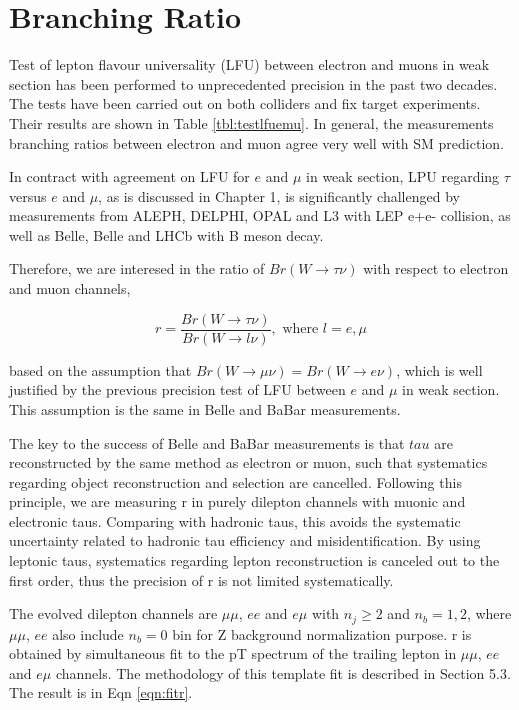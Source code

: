 

\section{Branching Ratio}

Test of lepton flavour universality (LFU) between electron and muons in 
weak section has been performed to unprecedented precision
in the past two decades. The tests have been carried out on both
colliders and fix target experiments. Their results are shown
in Table \ref{tbl:testlfuemu}. In general, the measurements
branching ratios between electron and muon agree very well with 
SM prediction.



In contract with agreement on LFU for $e$ and $\mu$ in weak section, LPU 
regarding $\tau$ versus $e$ and $\mu$, as is discussed in Chapter 1, 
is significantly challenged by 
measurements from ALEPH, DELPHI, OPAL and L3 with LEP e+e- collision, 
as well as Belle, Belle and LHCb with B meson decay.


Therefore, we are interesed in the ratio of $Br (W\to \tau \nu)$ with respect to electron
and muon channels,

\begin{equation}
    r = \frac{Br (W\to \tau \nu)}{Br (W\to l \nu)} , \text{ where } l=e,\mu
\end{equation}

based on the assumption that $Br (W\to \mu \nu) = Br( W\to e \nu )$, which
is well justified by the previous precision test of LFU between $e$ and $\mu$ in weak section.
This assumption is the same in Belle and BaBar measurements.

The key to the success of Belle and BaBar measurements is that $tau$ are reconstructed
by the same method as electron or muon, such that systematics regarding object
reconstruction and selection are cancelled.
Following this principle, we are measuring r in purely dilepton channels with muonic and electronic taus.
Comparing with hadronic taus, this avoids the systematic uncertainty related to hadronic tau efficiency
and misidentification.
By using leptonic taus, systematics regarding lepton reconstruction 
is canceled out to the first order, thus the precision of r is not limited systematically.

The evolved dilepton channels are $\mu\mu$, $ee$ and $e\mu$ with $n_j \geq 2$ and $n_b = 1,2$,
where $\mu\mu$, $ee$ also include $n_b = 0$ bin for Z background normalization purpose.
r is obtained by simultaneous fit to the pT spectrum of the trailing lepton in $\mu\mu$,
$ee$ and $e\mu$ channels. The methodology of this template fit is described in Section 5.3.
The result is in Eqn \ref{eqn:fitr}.

